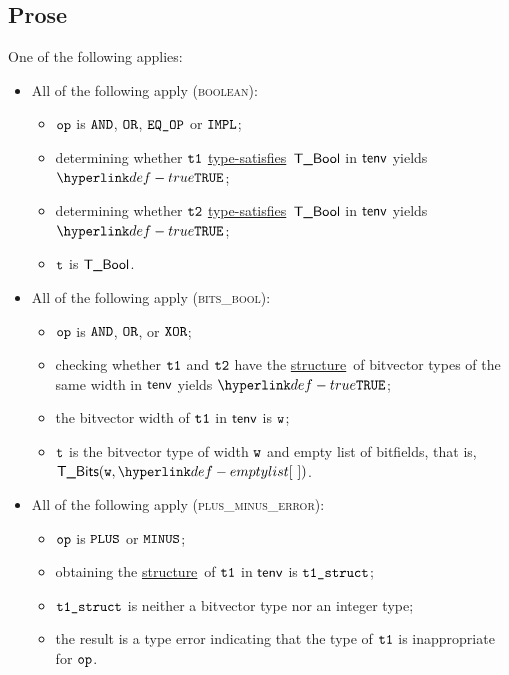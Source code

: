\documentclass{book}
\newcommand\ProseOrTypeError[0]{\ProseTerminateAs{\TypeErrorConfig}}
\newcommand\structure[0]{\hyperlink{def-structure}{structure}}
\newcommand\typesatisfies[0]{\hyperlink{def-typesatisfies}{type-satisfies}}
\begin{document}
\subsection{Prose}
One of the following applies:
\begin{itemize}
  \item All of the following apply (\textsc{boolean}):
  \begin{itemize}
    \item $\texttt{op}$ is $\texttt{AND}$, $\texttt{OR}$, $\texttt{EQ\_OP}$ or $\texttt{IMPL}$;
    \item determining whether $\texttt{t1}$ \typesatisfies\ $\textsf{T\_Bool}$ in $\textsf{tenv}$ yields $\True$\ProseOrTypeError;
    \item determining whether $\texttt{t2}$ \typesatisfies\ $\textsf{T\_Bool}$ in $\textsf{tenv}$ yields $\True$\ProseOrTypeError;
    \item $\texttt{t}$ is $\textsf{T\_Bool}$.
  \end{itemize}

  \item All of the following apply (\textsc{bits\_bool}):
  \begin{itemize}
    \item $\texttt{op}$ is $\texttt{AND}$, $\texttt{OR}$, or $\texttt{XOR}$;
    \item checking whether $\texttt{t1}$ and $\texttt{t2}$ have the \structure\ of bitvector types
          of the same width in $\textsf{tenv}$ yields $\True$\ProseOrTypeError;
    \item the bitvector width of $\texttt{t1}$ in $\textsf{tenv}$ is $\texttt{w}$;
    \item $\texttt{t}$ is the bitvector type of width $\texttt{w}$ and empty list of bitfields, that is, \\ $\TBits(\vw, \emptylist)$.
  \end{itemize}

  \item All of the following apply (\textsc{plus\_minus\_error}):
  \begin{itemize}
    \item $\texttt{op}$ is $\texttt{PLUS}$ or $\texttt{MINUS}$;
    \item obtaining the \structure\ of $\texttt{t1}$ in $\textsf{tenv}$ is $\texttt{t1\_struct}$\ProseOrTypeError;
    \item $\texttt{t1\_struct}$ is neither a bitvector type nor an integer type;
    \item the result is a type error indicating that the type of $\texttt{t1}$ is inappropriate for $\texttt{op}$.
  \end{itemize}


\end{itemize}
\end{document}
